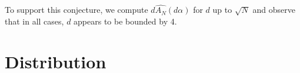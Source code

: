 \documentclass{article}
\theoremstyle{definition}
\theoremstyle{remark}
\numberwithin{equation}{section}
\begin{document}






To support this conjecture, we compute $d \widehat{A_N}(d\alpha)$ for
$d$ up to $\sqrt{N}$ and observe that in all cases, $d$ appears to be
bounded by 4.  

\section{Distribution}
\end{document}
